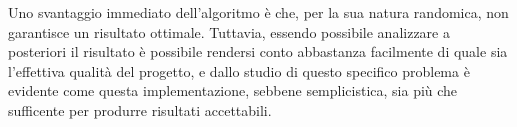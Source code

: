\documentclass[fleqn,11pt]{SelfArx} %
\begin{document}
Uno svantaggio immediato dell'algoritmo è che, per la sua natura randomica, non garantisce un risultato ottimale.
Tuttavia, essendo possibile analizzare a posteriori il risultato è possibile rendersi conto abbastanza facilmente di quale sia l'effettiva qualità del progetto, e dallo studio di questo specifico problema è evidente come questa implementazione, sebbene semplicistica, sia più che sufficente per produrre risultati accettabili.



\nocite{*}
\printbibliography
% 
\end{document}
